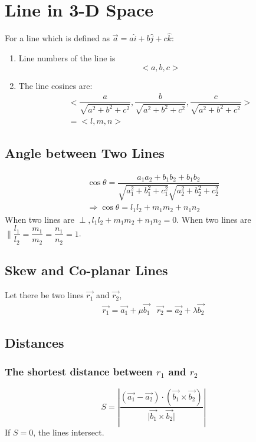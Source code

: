 \large{\chapter{Line in 3-D Space}}
For a line which is defined as $\vec{a}=a\hat{i}+b\hat{j}+c\hat{k}$:
\begin{enumerate}
	\item Line numbers of the line is
	\begin{equation}
		<a,b,c>
	\end{equation}
	\item The line cosines are:
	\begin{align}
		<\dfrac{a}{\sqrt{a^2+b^2+c^2}},\dfrac{b}{\sqrt{a^2+b^2+c^2}},\dfrac{c}{\sqrt{a^2+b^2+c^2}}>\\
		=<l,m,n>
	\end{align}
\end{enumerate}

\section{Angle between Two Lines\newline}
\begin{align}
	\cos \theta	=\dfrac{a_1a_2+b_1b_2+b_1b_2}{\sqrt{a_1^2+b_1^2+c_1^2}\sqrt{a_2^2+b_2^2+c_2^2}}\\
	\Rightarrow \cos \theta= l_1l_2+m_1m_2+n_1n_2
\end{align}
When two lines are $\perp, l_1l_2+m_1m_2+n_1n_2=0$.\newline
When two lines are $\parallel \dfrac{l_1}{l_2}=\dfrac{m_1}{m_2}=\dfrac{n_1}{n_2}=1$.

\section{Skew and Co-planar Lines}
Let there be two lines $\vec{r_1}$ and $\vec{r_2}$,
\begin{equation}
	\begin{split}
		\vec{r_1}=\vec{a_1}+\mu \vec{b_1} & \vec{r_2}=\vec{a_2}+\lambda \vec{b_2}
	\end{split}
\end{equation}

\section{Distances}
\subsection{The shortest distance between $r_1$ and $r_2$\newline}
\begin{equation}
	S=\left\lvert \dfrac{(\vec{a_1}-\vec{a_2})\cdot (\vec{b_1}\times\vec{b_2})}{\lvert \vec{b_1}\times\vec{b_2} \rvert}\right\rvert
\end{equation}
If $S=0$, the lines intersect.

